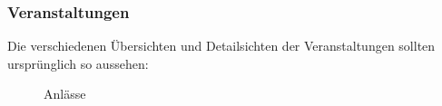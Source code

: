 \FloatBarrier
\subsubsection{Veranstaltungen}\label{mockup_singingobjects}
Die verschiedenen Übersichten und Detailsichten der Veranstaltungen sollten ursprünglich so aussehen:
\begin{figure}[ht]
\centering
{}
\label{fig:mockup_event}
\caption{Anlässe}
\end{figure}

